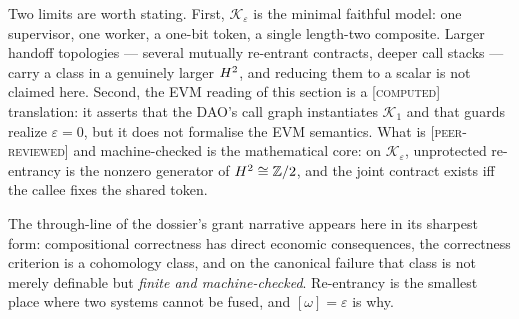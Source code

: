 \begin{remark}
Two limits are worth stating. First, $\mathcal K_\varepsilon$ is the minimal faithful model:
one supervisor, one worker, a one-bit token, a single length-two composite. Larger handoff
topologies --- several mutually re-entrant contracts, deeper call stacks --- carry a class in
a genuinely larger $H^2$, and reducing them to a scalar is not claimed here. Second, the
EVM reading of this section is a \textsc{[computed]} translation: it asserts that the DAO's
call graph instantiates $\mathcal K_1$ and that guards realize $\varepsilon=0$, but it does
not formalise the EVM semantics. What is \textsc{[peer-reviewed]} and machine-checked is the
mathematical core: on $\mathcal K_\varepsilon$, unprotected re-entrancy is the nonzero
generator of $H^2\cong\mathbb{Z}/2$, and the joint contract exists iff the callee fixes the shared
token.
\end{remark}


The through-line of the dossier's grant narrative appears here in its sharpest form:
compositional correctness has direct economic consequences, the correctness criterion is a
cohomology class, and on the canonical failure that class is not merely definable but
\emph{finite and machine-checked}. Re-entrancy is the smallest place where two systems
cannot be fused, and $[\omega]=\varepsilon$ is why.
